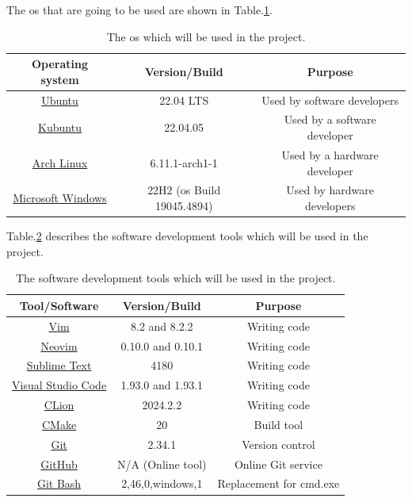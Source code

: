 The \ac{os} that are going to be used are shown in Table.\:\ref{tab:operating_system}.
\begin{table}[H]
    \centering
    \caption{The \ac{os} which will be used in the project.}
    \label{tab:operating_system}
    \begin{tabular}{|c|c|c|} \hline
         \textbf{Operating system} & \textbf{Version/Build} & \textbf{Purpose} \\ \hline
         \href{https://releases.ubuntu.com/jammy/}{Ubuntu} & 22.04 LTS & Used by software developers \\ \hline
         \href{https://kubuntu.org/getkubuntu/}{Kubuntu} & 22.04.05 & Used by a software developer \\ \hline
         \href{https://archlinux.org/}{Arch Linux} & 6.11.1-arch1-1 & Used by a hardware developer \\ \hline
         \href{https://www.microsoft.com/en-us/download/windows}{Microsoft Windows} & 22H2 (\ac{os} Build 19045.4894) & Used by hardware developers \\ \hline
    \end{tabular}
\end{table}

Table.\:\ref{tab:software_development_tools} describes the software development tools which will be used in the project.

\begin{table}[H]
    \centering
    \caption{The software development tools which will be used in the project.}
    \label{tab:software_development_tools}
    \begin{tabular}{|c|c|c|} \hline
         \textbf{Tool/Software} & \textbf{Version/Build} & \textbf{Purpose} \\ \hline
         \href{https://www.vim.org/vim-8.2-released.php}{Vim} & 8.2 and 8.2.2 & Writing code \\ \hline
         \href{https://neovim.io/}{Neovim} & 0.10.0 and 0.10.1 & Writing code \\ \hline
         \href{https://www.sublimetext.com/}{Sublime Text} & 4180 & Writing code \\ \hline
         \href{https://code.visualstudio.com/}{Visual Studio Code} & 1.93.0 and 1.93.1 & Writing code \\ \hline
         \href{https://www.jetbrains.com/clion/}{CLion} & 2024.2.2 & Writing code \\ \hline
         \href{https://cmake.org/}{CMake} & 20 & Build tool \\ \hline
         \href{https://git-scm.com/}{Git} & 2.34.1 & Version control \\ \hline
         \href{https://github.com/}{GitHub} & N/A (Online tool) & Online Git service \\ \hline
         \href{https://gitforwindows.org/}{Git Bash} & 2,46,0,windows,1 & Replacement for cmd.exe \\ \hline
    \end{tabular}
\end{table}


